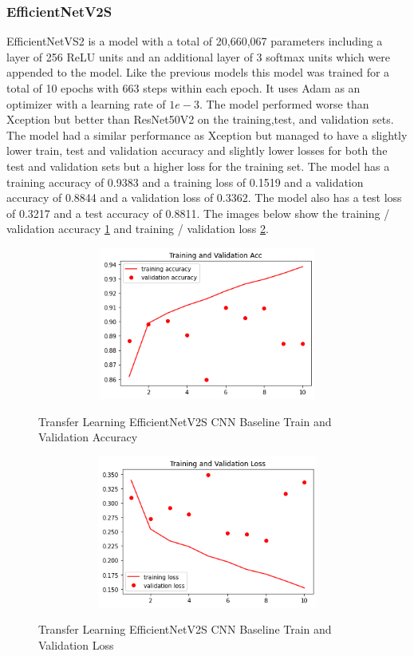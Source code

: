 \subsubsection{EfficientNetV2S}
EfficientNetVS2 is a model with a total of 20,660,067 parameters including a layer of 256 ReLU units and an additional layer of 3 softmax units which were appended to the model.  Like the previous models this model was trained for a total of 10 epochs with 663 steps within each epoch.  It uses Adam as an optimizer with a learning rate of $1e-3$.  The model performed worse than Xception but better than ResNet50V2 on the training,test, and validation sets. The model had a similar performance as Xception but managed to have a slightly lower train, test and validation accuracy and slightly lower losses for both the test and validation sets but a higher loss for the training set.  The model has a training accuracy of 0.9383 and a training loss of 0.1519 and a validation accuracy of 0.8844 and a validation loss of 0.3362.  The model also has a test loss of 0.3217 and a test accuracy of 0.8811. The images below show the training / validation accuracy \ref{fig:Transfer Learning EfficientNetV2S CNN Baseline Train and Validation Accuracy Radiography} and training / validation loss \ref{fig:Transfer Learning EfficientNetV2S CNN Baseline Train and Validation Loss Radiography}. 
 \begin{figure}[H]
    \centering
    \includegraphics[width=1\textwidth,height=5cm,keepaspectratio]{Images/EfficientNetV2SBaselineTrainingValidationAccRadiography.png}\\
    \caption{Transfer Learning EfficientNetV2S CNN Baseline Train and Validation Accuracy}
    \label{fig:Transfer Learning EfficientNetV2S CNN Baseline Train and Validation Accuracy Radiography}
\end{figure}
 \begin{figure}[H]
    \centering
    \includegraphics[width=1\textwidth,height=5cm,keepaspectratio]{Images/EfficientNetV2SBaselineTrainingValidationLossRadiography.png}\\
    \caption{Transfer Learning EfficientNetV2S CNN Baseline Train and Validation Loss}
    \label{fig:Transfer Learning EfficientNetV2S CNN Baseline Train and Validation Loss Radiography}
\end{figure}
